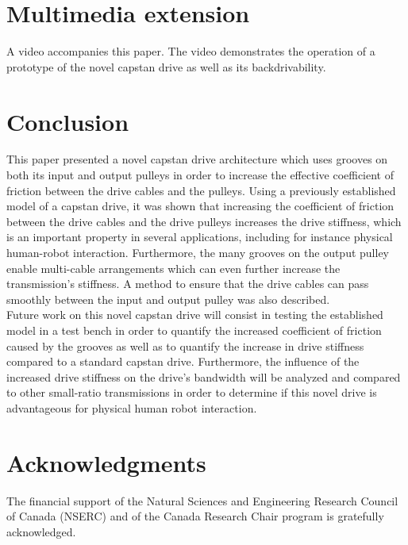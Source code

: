 \section{Multimedia extension}
A video accompanies this paper. The video demonstrates the operation of a prototype of the novel capstan drive as well as its backdrivability.
\section{Conclusion}
This paper presented a novel capstan drive architecture which uses grooves on both its input and output pulleys in order to increase the effective coefficient of friction between the drive cables and the pulleys. Using a previously established model of a capstan drive, it was shown that increasing the coefficient of friction between the drive cables and the drive pulleys increases the drive stiffness, which is an important property in several applications, including for instance physical human-robot interaction. Furthermore, the many grooves on the output pulley enable multi-cable arrangements which can even further increase the transmission's stiffness. A method to ensure that the drive cables can pass smoothly between the input and output pulley was also described. \\
Future work on this novel capstan drive will consist in testing the established model in a test bench in order to quantify the increased coefficient of friction caused by the grooves as well as to quantify the increase in drive stiffness compared to a standard capstan drive. Furthermore, the influence of the increased drive stiffness on the drive's bandwidth will be analyzed and compared to other small-ratio transmissions in order to determine if this novel drive is advantageous for physical human robot interaction.
\section*{Acknowledgments}
The financial support of the Natural Sciences and Engineering Research Council of Canada (NSERC) and of the Canada Research Chair program is gratefully acknowledged.





